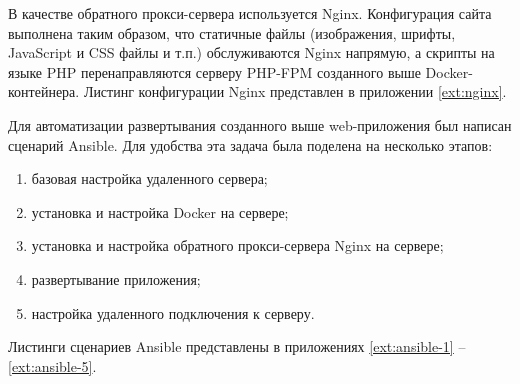 В качестве обратного прокси-сервера используется Nginx. Конфигурация сайта
выполнена таким образом, что статичные файлы (изображения, шрифты, JavaScript и
CSS файлы и т.п.) обслуживаются Nginx напрямую, а скрипты на языке PHP
перенаправляются серверу PHP-FPM созданного выше Docker-контейнера. Листинг
конфигурации Nginx представлен в приложении \ref{ext:nginx}.

Для автоматизации развертывания созданного выше web-приложения был написан
сценарий Ansible. Для удобства эта задача была поделена на несколько этапов:
\begin{enumerate}
    \item базовая настройка удаленного сервера;
    \item установка и настройка Docker на сервере;
    \item установка и настройка обратного прокси-сервера Nginx на сервере;
    \item развертывание приложения;
    \item настройка удаленного подключения к серверу.
\end{enumerate}

Листинги сценариев Ansible представлены в приложениях \ref{ext:ansible-1} --
\ref{ext:ansible-5}.

